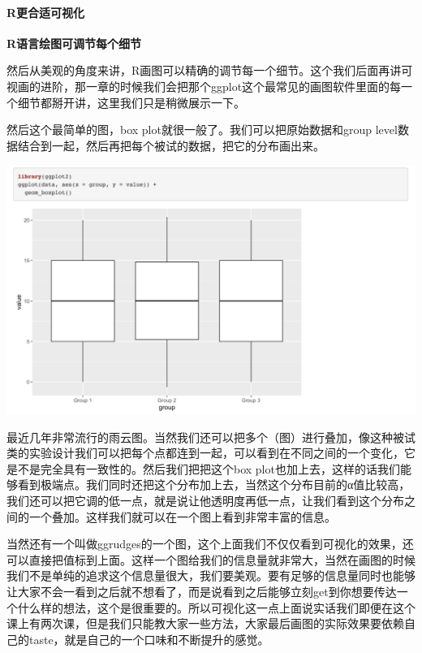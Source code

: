\documentclass[
  oneside]{book}
\begin{document}
\hypertarget{rux66f4ux5408ux9002ux53efux89c6ux5316}{%
\paragraph{R更合适可视化}\label{rux66f4ux5408ux9002ux53efux89c6ux5316}}

\textbf{R语言绘图可调节每个细节}

然后从美观的角度来讲，R画图可以精确的调节每一个细节。这个我们后面再讲可视画的进阶，那一章的时候我们会把那个ggplot这个最常见的画图软件里面的每一个细节都掰开讲，这里我们只是稍微展示一下。

然后这个最简单的图，box plot就很一般了。我们可以把原始数据和group
level数据结合到一起，然后再把每个被试的数据，把它的分布画出来。

\includegraphics{1001-lesson1/image-20230302201246104.png}

最近几年非常流行的雨云图。当然我们还可以把多个（图）进行叠加，像这种被试类的实验设计我们可以把每个点都连到一起，可以看到在不同之间的一个变化，它是不是完全具有一致性的。然后我们把把这个box
plot也加上去，这样的话我们能够看到极端点。我们同时还把这个分布加上去，当然这个分布目前的α值比较高，我们还可以把它调的低一点，就是说让他透明度再低一点，让我们看到这个分布之间的一个叠加。这样我们就可以在一个图上看到非常丰富的信息。

当然还有一个叫做ggrudges的一个图，这个上面我们不仅仅看到可视化的效果，还可以直接把值标到上面。这样一个图给我们的信息量就非常大，当然在画图的时候我们不是单纯的追求这个信息量很大，我们要美观。要有足够的信息量同时也能够让大家不会一看到之后就不想看了，而是说看到之后能够立刻get到你想要传达一个什么样的想法，这个是很重要的。所以可视化这一点上面说实话我们即便在这个课上有两次课，但是我们只能教大家一些方法，大家最后画图的实际效果要依赖自己的taste，就是自己的一个口味和不断提升的感觉。
\end{document}
